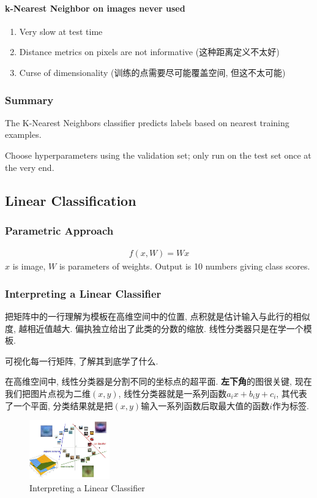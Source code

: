 \paragraph{k-Nearest Neighbor on images never used}
\begin{enumerate}
    \item Very slow at test time
    \item Distance metrics on pixels are not informative (这种距离定义不太好)
    \item Curse of dimensionality (训练的点需要尽可能覆盖空间, 但这不太可能)
\end{enumerate}

\subsubsection{Summary}
The K-Nearest Neighbors classifier predicts labels based on nearest training examples. 

Choose hyperparameters using the validation set; only run on the test set once at the very end. 

\subsection{Linear Classification}
\subsubsection{Parametric Approach}
\begin{align*}
    f(x, W)=Wx
\end{align*}
$x$ is image, $W$ is parameters of weights. Output is 10 numbers giving class scores. 

\subsubsection{Interpreting a Linear Classifier}

把矩阵中的一行理解为模板在高维空间中的位置, 点积就是估计输入与此行的相似度, 越相近值越大. 偏执独立给出了此类的分数的缩放. 线性分类器只是在学一个模板. 

可视化每一行矩阵, 了解其到底学了什么. 

在高维空间中, 线性分类器是分割不同的坐标点的超平面. \textbf{左下角}的图很关键, 现在我们把图片点视为二维$(x,y)$, 线性分类器就是一系列函数$a_i x+b_iy+c_i$, 其代表了一个平面, 分类结果就是把$(x,y)$输入一系列函数后取最大值的函数$i$作为标签. 
\begin{figure}[!htb]
    \centering
    \includegraphics[width=0.309\textwidth]{pic/Lec2/Interpreting a Linear Classifier}
    \caption{Interpreting a Linear Classifier}
\end{figure}

